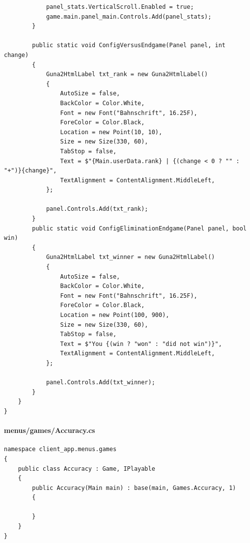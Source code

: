 \documentclass{article}
\begin{document}
\begin{verbatim}
			panel_stats.VerticalScroll.Enabled = true;
			game.main.panel_main.Controls.Add(panel_stats);
		}

		public static void ConfigVersusEndgame(Panel panel, int change)
		{
			Guna2HtmlLabel txt_rank = new Guna2HtmlLabel()
			{
				AutoSize = false,
				BackColor = Color.White,
				Font = new Font("Bahnschrift", 16.25F),
				ForeColor = Color.Black,
				Location = new Point(10, 10),
				Size = new Size(330, 60),
				TabStop = false,
				Text = $"{Main.userData.rank} | {(change < 0 ? "" : "+")}{change}",
				TextAlignment = ContentAlignment.MiddleLeft,
			};

			panel.Controls.Add(txt_rank);
		}
		public static void ConfigEliminationEndgame(Panel panel, bool win)
		{
			Guna2HtmlLabel txt_winner = new Guna2HtmlLabel()
			{
				AutoSize = false,
				BackColor = Color.White,
				Font = new Font("Bahnschrift", 16.25F),
				ForeColor = Color.Black,
				Location = new Point(100, 900),
				Size = new Size(330, 60),
				TabStop = false,
				Text = $"You {(win ? "won" : "did not win")}",
				TextAlignment = ContentAlignment.MiddleLeft,
			};

			panel.Controls.Add(txt_winner);
		}
	}
}
\end{verbatim}

\paragraph{menus/games/Accuracy.cs}\label{client/menus/games/accuracy.cs}
\begin{verbatim}
namespace client_app.menus.games
{
	public class Accuracy : Game, IPlayable
	{
		public Accuracy(Main main) : base(main, Games.Accuracy, 1)
		{

		}
	}
}
\end{verbatim}
\end{document}
